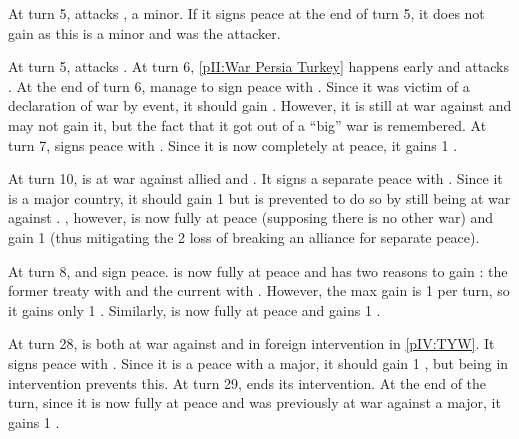\begin{exemple}
  At turn 5, \TUR attacks \paysDamas, a minor. If it signs peace at the end of
  turn 5, it does not gain \STAB as this is a minor and \TUR was the
  attacker.

  At turn 5, \TUR attacks \paysDamas. At turn 6, \ref{pII:War Persia Turkey}
  happens early and \paysPerse attacks \TUR. At the end of turn 6, \TUR manage
  to sign peace with \paysPerse. Since it was victim of a declaration of war
  by event, it should gain \STAB. However, it is still at war against
  \paysDamas and may not gain it, but the fact that it got out of a ``big''
  war is remembered. At turn 7, \TUR signs peace with \paysDamas. Since it is
  now completely at peace, it gains 1 \STAB.
\end{exemple}

\begin{exemple}
  At turn 10, \TUR is at war against allied \HIS and \VEN. It signs a separate
  peace with \VEN. Since it is a major country, it should gain 1 \STAB but is
  prevented to do so by still being at war against \HIS. \VEN, however, is now
  fully at peace (supposing there is no other war) and gain 1 \STAB (thus
  mitigating the 2 \STAB loss of breaking an alliance for separate peace). 

  At turn 8, \TUR and \HIS sign peace. \TUR is now fully at peace and has two
  reasons to gain \STAB: the former treaty with \VEN and the current with
  \HIS. However, the max gain is 1 per turn, so it gains only 1
  \STAB. Similarly, \HIS is now fully at peace and gains 1 \STAB.
\end{exemple}

\begin{exemple}
  At turn 28, \POL is both at war against \RUS and in foreign intervention in
  \ref{pIV:TYW}. It signs peace with \RUS. Since it is a peace with a major,
  it should gain 1 \STAB, but being in intervention prevents this. At turn 29,
  \POL ends its intervention. At the end of the turn, since it is now fully at
  peace and was previously at war against a major, it gains 1 \STAB.
\end{exemple}





